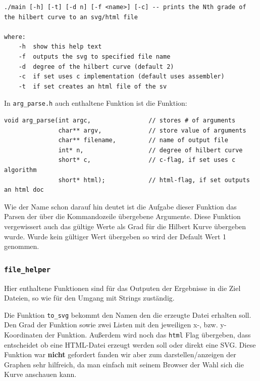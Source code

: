 \documentclass[course=erap]{aspdoc}
\begin{document}
\begin{lstlisting}[numbers=none,caption={Output von print\_help},label={usage},belowcaptionskip=0.6cm]
./main [-h] [-t] [-d n] [-f <name>] [-c] -- prints the Nth grade of the hilbert curve to an svg/html file

where:
	-h  show this help text
	-f  outputs the svg to specified file name
	-d  degree of the hilbert curve (default 2)
	-c  if set uses c implementation (default uses assembler)
	-t  if set creates an html file of the sv
\end{lstlisting}

In \lstinline{arg_parse.h} auch enthaltene Funktion ist die Funktion:
\begin{lstlisting}[caption={Signatur von arg\_parse},belowcaptionskip=0.6cm]
void arg_parse(int argc,                // stores # of arguments
               char** argv,             // store value of arguments
               char** filename,         // name of output file
               int* n,                  // degree of hilbert curve
               short* c,                // c-flag, if set uses c algorithm
               short* html);            // html-flag, if set outputs an html doc
\end{lstlisting}

Wie der Name schon darauf hin deutet ist die Aufgabe dieser Funktion das Parsen
der über die Kommandozeile übergebene Argumente. Diese Funktion vergewissert
auch das gültige Werte als Grad für die Hilbert Kurve übergeben wurde. Wurde
kein gültiger Wert übergeben so wird der Default Wert 1 genommen.

\subsubsection{\lstinline{file_helper}}\label{file_helper}
Hier enthaltene Funktionen sind für das Outputen der Ergebnisse in die Ziel
Dateien, so wie für den Umgang mit Strings zuständig. \newline

Die Funktion \lstinline{to_svg} bekommt den Namen den die erzeugte Datei
erhalten soll.  Den Grad der Funktion sowie zwei Listen mit den jeweiligen x-,
bzw. y-Koordinaten der Funktion. Außerdem wird noch das \lstinline{html} Flag
übergeben, dass entscheidet ob eine HTML-Datei erzeugt werden soll oder direkt
eine SVG. Diese Funktion war \textbf{nicht} gefordert fanden wir aber zum
darstellen/anzeigen der Graphen sehr hilfreich, da man einfach mit seinem
Browser der Wahl sich die Kurve anschauen kann.
\end{document}
